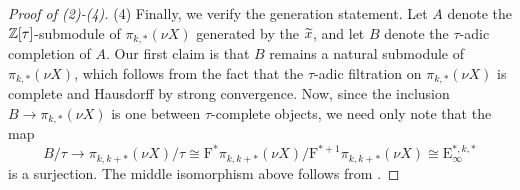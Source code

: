 \begin{proof}[Proof of (2)-(4)]
    (4) Finally, we verify the generation statement.
    Let $A$ denote the $\mathbb{Z}[\tau]$-submodule of $\pi_{k,*}(\nu X)$ generated by the $\wt{x}$, and let $B$ denote the $\tau$-adic completion of $A$. Our first claim is that $B$ remains a natural submodule of $\pi_{k,*}(\nu X)$, which follows from the fact that the $\tau$-adic filtration on $\pi_{k,*}(\nu X)$ is complete and Hausdorff by strong convergence.
		Now, since the inclusion $B \to \pi_{k,*}(\nu X)$ is one between $\tau$-complete objects, we need only note that the map
            $$ B/\tau \to \pi_{k,k+*}(\nu X)/\tau \cong \mathrm{F}^*\pi_{k,k+*}(\nu X)/\mathrm{F}^{*+1}\pi_{k,k+*}(\nu X) \cong \mathrm{E}_\infty^{*,k,*} $$
    is a surjection. The middle isomorphism above follows from .
\end{proof}

